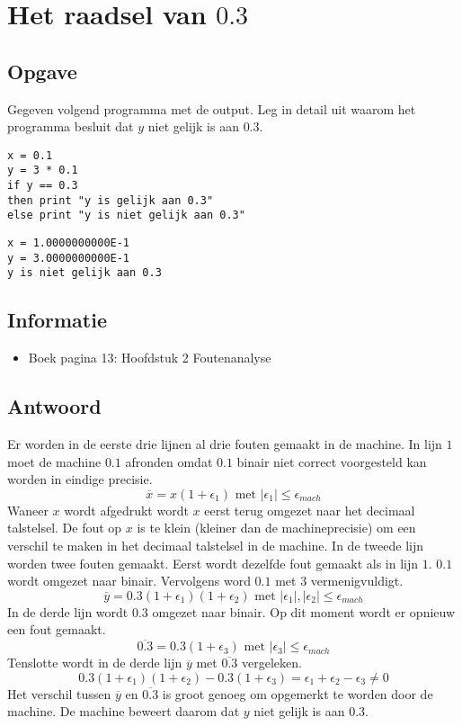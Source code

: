 \documentclass[examenvragen.tex]{subfiles}
\begin{document}
\section{Het raadsel van $0.3$}

\subsection{Opgave}
Gegeven volgend programma met de output. Leg in detail uit waarom het programma besluit dat $y$ niet gelijk is aan $0.3$.
\begin{lstlisting}
x = 0.1
y = 3 * 0.1
if y == 0.3
then print "y is gelijk aan 0.3"
else print "y is niet gelijk aan 0.3"
\end{lstlisting}
\begin{lstlisting}
x = 1.0000000000E-1
y = 3.0000000000E-1
y is niet gelijk aan 0.3
\end{lstlisting}

\subsection{Informatie}
\begin{itemize}
\item Boek pagina 13: Hoofdstuk 2 Foutenanalyse
\end{itemize}

\subsection{Antwoord}
Er worden in de eerste drie lijnen al drie fouten gemaakt in de machine.
In lijn $1$ moet de machine $0.1$ afronden omdat $0.1$ binair niet correct voorgesteld kan worden in eindige precisie.
\[
\overline{x} = x(1+\epsilon_1) \text{ met } |\epsilon_{1}| \le \epsilon_{mach}
\]
Waneer $x$ wordt afgedrukt wordt $x$ eerst terug omgezet naar het decimaal talstelsel. De fout op $x$ is te klein (kleiner dan de machineprecisie) om een verschil te maken in het decimaal talstelsel in de machine.
In de tweede lijn worden twee fouten gemaakt. Eerst wordt dezelfde fout gemaakt als in lijn $1$. $0.1$ wordt omgezet naar binair. Vervolgens word $0.1$ met $3$ vermenigvuldigt.
\[
\overline{y} = 0.3(1+\epsilon_1)(1+\epsilon_2) \text{ met } |\epsilon_{1}|,|\epsilon_{2}| \le \epsilon_{mach}
\]
In de derde lijn wordt $0.3$ omgezet naar binair. Op dit moment wordt er opnieuw een fout gemaakt.
\[
\overline{0.3} = 0.3(1+\epsilon_3) \text{ met }|\epsilon_{3}| \le \epsilon_{mach}
\]
Tenslotte wordt in de derde lijn $\overline{y}$ met $\overline{0.3}$ vergeleken.
\[
0.3(1+\epsilon_1)(1+\epsilon_2) - 0.3(1+\epsilon_3)
=
\epsilon_1+\epsilon_2-\epsilon_3 \neq 0
\]
Het verschil tussen $\overline{y}$ en $\overline{0.3}$ is groot genoeg om opgemerkt te worden door de machine. De machine beweert daarom dat $y$ niet gelijk is aan $0.3$.
\end{document}

